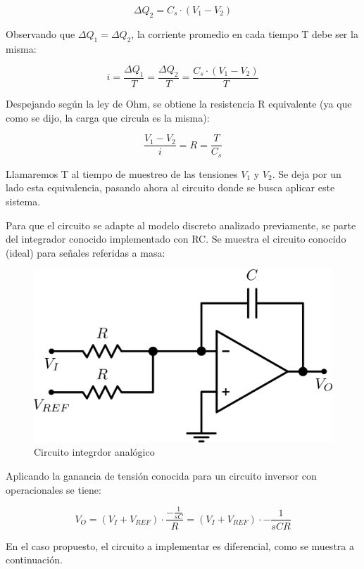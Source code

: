 \documentclass[assd_tp3_main.tex]{subfiles}
\begin{document}
\[
\Delta Q_2 = C_s \cdot (V_1 - V_2)
\]

Observando que $\Delta Q_1 = \Delta Q_2$, la corriente promedio en cada tiempo T debe ser la misma:

\[
i = \frac{\Delta Q_1}{T} = \frac{\Delta Q_2}{T} = \frac{C_s \cdot (V_1 - V_2)}{T}
\]

Despejando según la ley de Ohm, se obtiene la resistencia R equivalente (ya que como se dijo, la carga que circula es la misma):

\[
\frac{V_1 - V_2}{i} = R = \frac{T}{C_s}
\]

Llamaremos T al tiempo de muestreo de las tensiones $V_1$ y $V_2$. Se deja por un lado esta equivalencia, pasando ahora al circuito donde se busca aplicar este sistema.\par 
Para que el circuito se adapte al modelo discreto analizado previamente, se parte del integrador conocido implementado con RC. Se muestra el circuito conocido (ideal) para señales referidas a masa:

\begin{figure}[!ht]
\begin{centering}
\includegraphics[scale=0.5]{images/ej5/IntegradorBasico.png}
\par\end{centering}
\caption{Circuito integrdor analógico}
\end{figure}


Aplicando la ganancia de tensión conocida para un circuito inversor con operacionales se tiene:

\[
V_O = (V_I+V_{REF}) \cdot \frac{-\frac{1}{sC}}{R} = (V_I + V_{REF}) \cdot -\frac{1}{sCR}
\]

En el caso propuesto, el circuito a implementar es diferencial, como se muestra a continuación.
\end{document}

